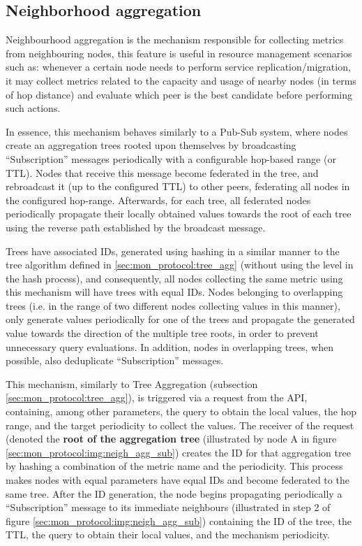 
\subsection{Neighborhood aggregation} \label{sec:mon_protocol:neigh_agg}

Neighbourhood aggregation is the mechanism responsible for collecting metrics from neighbouring nodes, this feature is useful in resource management scenarios such as: whenever a certain node needs to perform service replication/migration, it may collect metrics related to the capacity and usage of nearby nodes (in terms of hop distance) and evaluate which peer is the best candidate before performing such actions. 

In essence, this mechanism behaves similarly to a Pub-Sub system, where nodes create an aggregation trees rooted upon themselves by broadcasting ``Subscription'' messages periodically with a configurable hop-based range (or TTL).  Nodes that receive this message become federated in the tree, and rebroadcast it (up to the configured TTL) to other peers, federating all nodes in the configured hop-range. Afterwards, for each tree, all federated nodes periodically propagate their locally obtained values towards the root of each tree using the reverse path established by the broadcast message. 

Trees have associated IDs, generated using hashing in a similar manner to the tree algorithm defined in \ref{sec:mon_protocol:tree_agg} (without using the level in the hash process), and consequently, all nodes collecting the same metric using this mechanism will have trees with equal IDs. Nodes belonging to overlapping trees (i.e. in the range of two different nodes collecting values in this manner), only generate values periodically for one of the trees and propagate the generated value towards the direction of the multiple tree roots, in order to prevent unnecessary query evaluations. In addition, nodes in overlapping trees, when possible, also deduplicate ``Subscription'' messages.

This mechanism, similarly to Tree Aggregation (subsection \ref{sec:mon_protocol:tree_agg}), is triggered via a request from the API, containing, among other parameters, the query to obtain the local values, the hop range, and the target periodicity to collect the values. The receiver of the request (denoted the \textbf{root of the aggregation tree} (illustrated by node A in figure \ref{sec:mon_protocol:img:neigh_agg_sub}) creates the ID for that aggregation tree by hashing a combination of the metric name and the periodicity. This process makes nodes with equal parameters have equal IDs and become federated to the same tree. After the ID generation, the node begins propagating periodically a ``Subscription'' message to its immediate neighbours (illustrated in step 2 of figure \ref{sec:mon_protocol:img:neigh_agg_sub}) containing the ID of the tree, the TTL, the query to obtain their local values, and the mechanism periodicity. 

